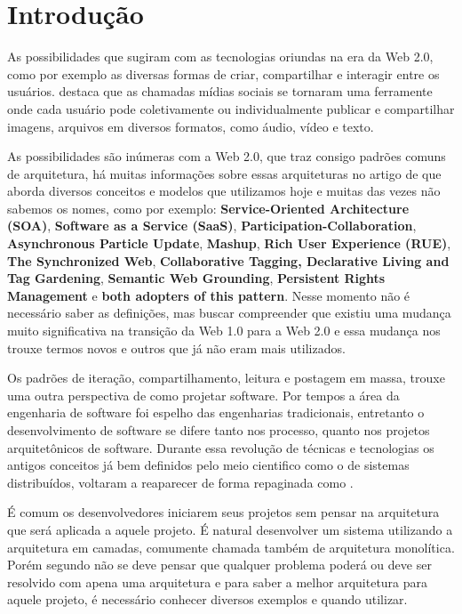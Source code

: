 

\chapter{Introdu\c{c}\~{a}o}

As possibilidades que sugiram com as tecnologias oriundas na era da Web 2.0, como por exemplo as diversas formas de criar, compartilhar e interagir entre os usuários.  destaca que as chamadas mídias sociais se tornaram uma ferramente onde cada usuário pode coletivamente ou individualmente publicar e compartilhar imagens, arquivos em diversos formatos, como áudio, vídeo e texto.

As possibilidades são inúmeras com a Web 2.0, que traz consigo padrões comuns de arquitetura, há muitas informações sobre essas arquiteturas no artigo de  que aborda diversos conceitos e modelos que utilizamos hoje e muitas das vezes não sabemos os nomes, como por exemplo: \textbf{Service-Oriented Architecture (SOA)}, \textbf{Software as a Service (SaaS)}, \textbf{Participation-Collaboration}, \textbf{Asynchronous Particle Update}, \textbf{Mashup}, \textbf{Rich User Experience (RUE)}, \textbf{The Synchronized Web}, \textbf{Collaborative Tagging, Declarative Living and Tag Gardening}, \textbf{Semantic Web Grounding}, \textbf{Persistent Rights Management} e  \textbf{both adopters of this pattern}. Nesse momento não é necessário saber as definições, mas buscar compreender que existiu uma mudança muito significativa na transição da Web 1.0 para a Web 2.0 e essa mudança nos trouxe termos novos e outros que já não eram mais utilizados.

Os padrões de iteração, compartilhamento, leitura e postagem em massa, trouxe uma outra perspectiva de como projetar software. Por tempos a área da engenharia de software foi espelho das engenharias tradicionais, entretanto o desenvolvimento de software se difere tanto nos processo, quanto nos projetos arquitetônicos de software. Durante essa revolução de técnicas e tecnologias os antigos conceitos já bem definidos pelo meio cientifico como o de sistemas distribuídos, voltaram a reaparecer de forma repaginada como .

É comum os desenvolvedores iniciarem seus projetos sem pensar na arquitetura que será aplicada a aquele projeto. É natural desenvolver um sistema utilizando a arquitetura em camadas, comumente chamada também de arquitetura monolítica. Porém segundo  não se deve pensar que qualquer problema poderá ou deve ser resolvido com apena uma arquitetura e para saber a melhor arquitetura para aquele projeto, é necessário conhecer diversos exemplos e quando utilizar.

